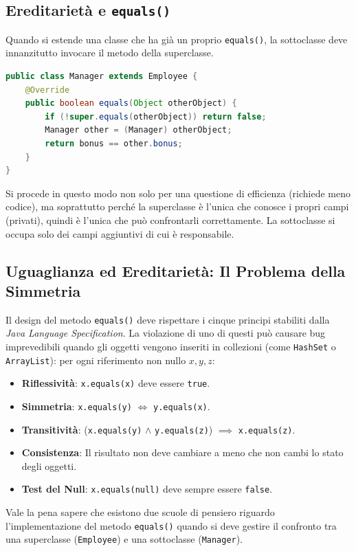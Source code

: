 \subsection*{Ereditarietà e \texttt{equals()}}
Quando si estende una classe che ha già un proprio \texttt{equals()}, la sottoclasse deve innanzitutto invocare il metodo della superclasse.

\begin{lstlisting}[language=Java]
public class Manager extends Employee {
    @Override
    public boolean equals(Object otherObject) {
        if (!super.equals(otherObject)) return false;
        Manager other = (Manager) otherObject;
        return bonus == other.bonus;
    }
}
\end{lstlisting}

Si procede in questo modo non solo per una questione di efficienza (richiede meno codice), ma soprattutto perché la superclasse è l'unica che conosce i propri campi (privati), quindi è l'unica che può confrontarli correttamente. La sottoclasse si occupa solo dei campi aggiuntivi di cui è responsabile.  

\subsection*{Uguaglianza ed Ereditarietà: Il Problema della Simmetria}

Il design del metodo \texttt{equals()} deve rispettare i cinque principi stabiliti dalla \textit{Java Language Specification}. La violazione di uno di questi può causare bug imprevedibili quando gli oggetti vengono inseriti in collezioni (come \texttt{HashSet} o \texttt{ArrayList}):
 per ogni riferimento non nullo $x, y, z$:
\begin{itemize}
    \item \textbf{Riflessività}: \texttt{x.equals(x)} deve essere \texttt{true}.
    \item \textbf{Simmetria}: \texttt{x.equals(y)} $\iff$ \texttt{y.equals(x)}.
    \item \textbf{Transitività}: (\texttt{x.equals(y)} $\land$ \texttt{y.equals(z)}) $\implies$ \texttt{x.equals(z)}.
    \item \textbf{Consistenza}: Il risultato non deve cambiare a meno che non cambi lo stato degli oggetti.
    \item \textbf{Test del Null}: \texttt{x.equals(null)} deve sempre essere \texttt{false}.
\end{itemize}

Vale la pena sapere che esistono due scuole di pensiero riguardo l'implementazione del metodo \texttt{equals()} quando si deve gestire il confronto tra una superclasse (\texttt{Employee}) e una sottoclasse (\texttt{Manager}).

